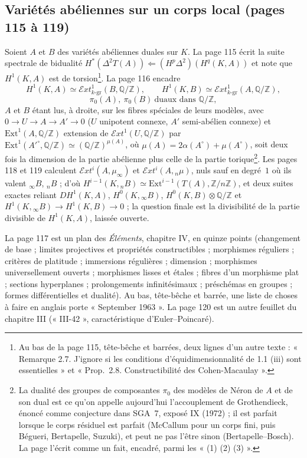 \documentclass[11pt,a4paper]{article}
\begin{document}
\subsection*{Variétés abéliennes sur un corps local (pages 115 à 119)}

Soient $A$ et $B$ des variétés abéliennes duales sur $K$. La page 115 écrit la
suite spectrale de bidualité $H^{*}(\Delta^2 T(A)) \Leftarrow (H^p\Delta^2)(H^q(K,
A))$ et note que $H^1(K, A)$ est de torsion\footnote{Au bas de la page 115, tête-bêche et barrées, deux lignes d'un autre texte : « Remarque 2.7. J'ignore si les conditions d'équidimensionnalité de 1.1 (iii) sont essentielles » et « Prop.~2.8. Constructibilité des Cohen-Macaulay ».}. La page 116 encadre
\[
H^1(K, A) \simeq \mathcal{E}xt^1_{k\text{-gr}}(B, \mathbb{Q}/\mathbb{Z}),
\qquad
H^1(K, B) \simeq \mathcal{E}xt^1_{k\text{-gr}}(A, \mathbb{Q}/\mathbb{Z}),
\]
\[
\pi_0(A),\ \pi_0(B)\ \text{duaux dans } \mathbb{Q}/\mathbb{Z},
\]
$A$ et $B$ étant lus, à droite, sur les fibres spéciales de leurs modèles, avec
$0 \to U \to A \to A' \to 0$ ($U$ unipotent connexe, $A'$ semi-abélien connexe) et
$\mathrm{Ext}^1(A, \mathbb{Q}/\mathbb{Z})$ extension de $\mathcal{E}xt^1(U,
\mathbb{Q}/\mathbb{Z})$ par $\mathrm{Ext}^1(A'^{\circ}, \mathbb{Q}/\mathbb{Z})
\simeq (\mathbb{Q}/\mathbb{Z})^{\mu(A)}$, où $\mu(A) = 2\alpha(A^{\circ}) +
\mu(A^{\circ})$, soit deux fois la dimension de la partie abélienne plus celle de la
partie torique\footnote{La dualité des groupes de composantes $\pi_0$ des
modèles de Néron de $A$ et de son dual est ce qu'on appelle aujourd'hui
l'accouplement de Grothendieck, énoncé comme conjecture dans SGA~7, exposé IX
(1972) ; il est parfait lorsque le corps résiduel est parfait (McCallum pour un
corps fini, puis Bégueri, Bertapelle, Suzuki), et peut ne pas l'être sinon
(Bertapelle–Bosch). La page l'écrit comme un fait, encadré, parmi les
« (1) (2) (3) ».}. Les pages 118 et 119 calculent $\mathcal{E}xt^i(A,
\mu_\infty)$ et $\mathcal{E}xt^i(A, {}_n\mu)$, nuls sauf en degré~$1$ où ils valent
${}_\infty B$, ${}_n B$ ; d'où $H^{i-1}(K, {}_nB) \simeq \mathrm{Ext}^{i-1}(T(A),
\mathbb{Z}/n\mathbb{Z})$, et deux suites exactes reliant $DH^1(K, A)$,
$H^0(K, {}_\infty B)$, $H^0(K, B) \otimes \mathbb{Q}/\mathbb{Z}$ et
$H^1(K, {}_\infty B) \to H^1(K, B) \to 0$ ; la question finale est la
divisibilité de la partie divisible de $H^1(K, A)$, laissée ouverte.

La page 117 est un plan des \emph{Éléments}, chapitre IV, en quinze points
(changement de base ; limites projectives et propriétés constructibles ;
morphismes réguliers ; critères de platitude ; immersions régulières ; dimension ;
morphismes universellement ouverts ; morphismes lisses et étales ; fibres d'un
morphisme plat ; sections hyperplanes ; prolongements infinitésimaux ;
préschémas en groupes ; formes différentielles et dualité). Au bas, tête-bêche et
barrée, une liste de choses à faire en anglais porte « September 1963 ». La page
120 est un autre feuillet du chapitre III (« III-42 », caractéristique
d'Euler–Poincaré).
\end{document}
